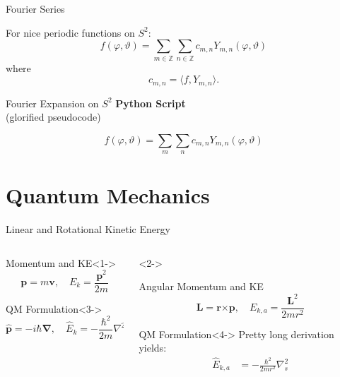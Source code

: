 \documentclass[xetex, onlymath, aspectratio=169]{beamer}
\renewcommand{\vec}[1]{\mathbf{\bm{#1}}}
\begin{document}
\begin{frame}{Fourier Series}
	\begin{theorem}
		For nice periodic functions on \(S^2\):
  	\[
  		f(\varphi, \vartheta) = \sum_{m \in \mathbb{Z}} \sum_{n \in \mathbb{Z}}
				c_{m, n} Y_{m, n} (\varphi, \vartheta)
  	\]
		where
		\[
			c_{m, n} = \langle f, Y_{m, n} \rangle.
		\]
	\end{theorem}
\end{frame}

\begin{frame}{Fourier Expansion on \(S^2\)}
	\centering
	{\LARGE \bfseries Python Script} \\[1em]
	{(glorified pseudocode)}
	
	 	\[
  		f(\varphi, \vartheta) = \sum_{m} \sum_{n}
				c_{m, n} Y_{m, n} (\varphi, \vartheta)
  	\]
\end{frame}

\section{Quantum Mechanics}

\begin{frame}{Linear and Rotational Kinetic Energy}
	\begin{columns}
		\begin{column}{.5\linewidth}
			\begin{block}{Momentum and KE}<1->
				\[
					\vec{p} = m \vec{v},
					\quad
					E_k = \frac{\vec{p}^2}{2m}
				\]
			\end{block}
			\begin{alertblock}{QM Formulation}<3->
  			\[
						\vec{\hat{p}} = -i\hbar \bm{\nabla},
						\quad
						\hat{E}_k = -\frac{\hbar^2}{2m} \nabla^2
  			\]
			\end{alertblock}
		\end{column}
		\begin{column}{.5\linewidth}<2->
				\begin{block}{Angular Momentum and KE}
				\[
					\vec{L} = \vec{r}\bm{\times}{\vec{p}},
					\quad
					E_{k, a} = \frac{\vec{L}^2}{2m r^2}
				\]
			\end{block}
			\begin{alertblock}{QM Formulation}<4->
				Pretty long derivation yields:
				\begin{align*}
					\hat{E}_{k, a} &= -\frac{\hbar^2}{2mr^2} \nabla^2_s
				\end{align*}
			\end{alertblock}
		\end{column}
	\end{columns}
\end{frame}
\end{document}
